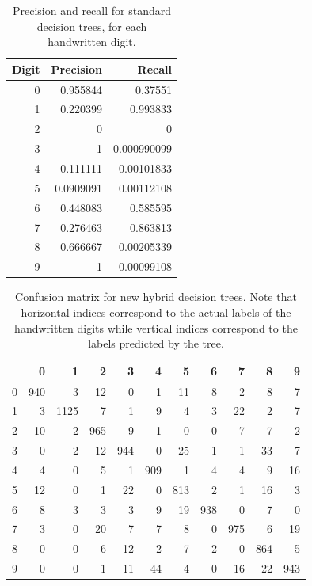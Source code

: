 \begin{table}
	\centering
	\begin{tabular}{rrr}
		Digit &   Precision &      Recall \\
		\hline
		0 &   0.955844  & 0.37551     \\
		1 &   0.220399  & 0.993833    \\
		2 &   0         & 0           \\
		3 &   1         & 0.000990099 \\
		4 &   0.111111  & 0.00101833  \\
		5 &   0.0909091 & 0.00112108  \\
		6 &   0.448083  & 0.585595    \\
		7 &   0.276463  & 0.863813    \\
		8 &   0.666667  & 0.00205339  \\
		9 &   1         & 0.00099108  \\
	\end{tabular}
	\caption{Precision and recall for standard decision trees, for each handwritten digit.}
	\label{table:no_kd_precision_recall}
\end{table}

\begin{table}
	\begin{tabular}{r|rrrrrrrrrr}
		&   0 &    1 &   2 &   3 &   4 &   5 &   6 &   7 &   8 &   9 \\
		\hline
		0 & 940 &    3 &  12 &   0 &   1 &  11 &   8 &   2 &   8 &   7 \\
		1 &   3 & 1125 &   7 &   1 &   9 &   4 &   3 &  22 &   2 &   7 \\
		2 &  10 &    2 & 965 &   9 &   1 &   0 &   0 &   7 &   7 &   2 \\
		3 &   0 &    2 &  12 & 944 &   0 &  25 &   1 &   1 &  33 &   7 \\
		4 &   4 &    0 &   5 &   1 & 909 &   1 &   4 &   4 &   9 &  16 \\
		5 &  12 &    0 &   1 &  22 &   0 & 813 &   2 &   1 &  16 &   3 \\
		6 &   8 &    3 &   3 &   3 &   9 &  19 & 938 &   0 &   7 &   0 \\
		7 &   3 &    0 &  20 &   7 &   7 &   8 &   0 & 975 &   6 &  19 \\
		8 &   0 &    0 &   6 &  12 &   2 &   7 &   2 &   0 & 864 &   5 \\
		9 &   0 &    0 &   1 &  11 &  44 &   4 &   0 &  16 &  22 & 943 \\
	\end{tabular}
	\caption{Confusion matrix for new hybrid decision trees.  Note that horizontal indices correspond to the actual labels of the handwritten digits while vertical indices correspond to the labels predicted by the tree.}
	\label{table:with_kd_confusion}
\end{table}

